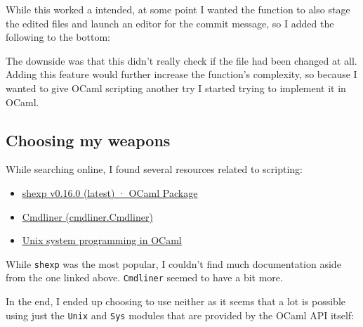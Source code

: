 \documentclass[11pt]{article}
\providecommand{\tightlist}{%
      \setlength{\itemsep}{0pt}\setlength{\parskip}{0pt}}
\newenvironment{Shaded}{}{}
\newcommand{\KeywordTok}[1]{\textcolor[rgb]{0.00,0.44,0.13}{\textbf{{#1}}}}
\newcommand{\StringTok}[1]{\textcolor[rgb]{0.25,0.44,0.63}{{#1}}}
\newcommand{\FunctionTok}[1]{\textcolor[rgb]{0.02,0.16,0.49}{{#1}}}
\newcommand{\NormalTok}[1]{{#1}}
\newcommand{\VariableTok}[1]{\textcolor[rgb]{0.10,0.09,0.49}{{#1}}}
\newcommand{\ControlFlowTok}[1]{\textcolor[rgb]{0.00,0.44,0.13}{\textbf{{#1}}}}
\newcommand{\OperatorTok}[1]{\textcolor[rgb]{0.40,0.40,0.40}{{#1}}}
\newcommand{\BuiltInTok}[1]{{#1}}
\newcommand{\AttributeTok}[1]{\textcolor[rgb]{0.49,0.56,0.16}{{#1}}}
\begin{document}
    While this worked a intended, at some point I wanted the function to
also stage the edited files and launch an editor for the commit message,
so I added the following to the bottom:

    \begin{Shaded}
\end{Shaded}

    The downside was that this didn't really check if the file had been
changed at all. Adding this feature would further increase the
function's complexity, so because I wanted to give OCaml scripting
another try I started trying to implement it in OCaml.

    \hypertarget{choosing-my-weapons}{%
\subsection{Choosing my weapons}\label{choosing-my-weapons}}

    While searching online, I found several resources related to scripting:

\begin{itemize}
\tightlist
\item
  \href{https://ocaml.org/p/shexp/latest/doc/Shexp_process/index.html}{shexp
  v0.16.0 (latest) · OCaml Package}
\item
  \href{https://erratique.ch/software/cmdliner/doc/Cmdliner/}{Cmdliner
  (cmdliner.Cmdliner)}
\item
  \href{http://ocaml.github.io/ocamlunix/}{Unix system programming in
  OCaml}
\end{itemize}

While \texttt{shexp} was the most popular, I couldn't find much
documentation aside from the one linked above. \texttt{Cmdliner} seemed
to have a bit more.

In the end, I ended up choosing to use neither as it seems that a lot is
possible using just the \texttt{Unix} and \texttt{Sys} modules that are
provided by the OCaml API itself:
\end{document}
